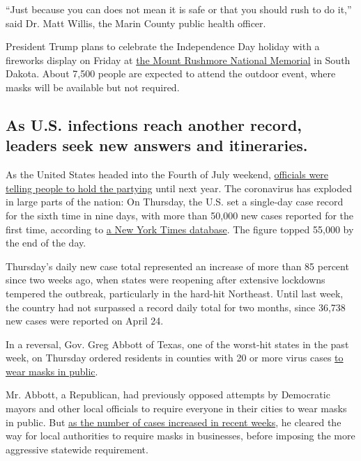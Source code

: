 ``Just because you can does not mean it is safe or that you should rush
to do it,'' said Dr. Matt Willis, the Marin County public health
officer.

President Trump plans to celebrate the Independence Day holiday with a
fireworks display on Friday at
\href{https://www.nytimes3xbfgragh.onion/2020/07/01/us/mount-rushmore.html}{the
Mount Rushmore National Memorial} in South Dakota. About 7,500 people
are expected to attend the outdoor event, where masks will be available
but not required.

\hypertarget{as-us-infections-reach-another-record-leaders-seek-new-answers-and-itineraries}{%
\subsection{As U.S. infections reach another record, leaders seek new
answers and
itineraries.}\label{as-us-infections-reach-another-record-leaders-seek-new-answers-and-itineraries}}

As the United States headed into the Fourth of July weekend,
\href{https://www.nytimes3xbfgragh.onion/2020/07/02/us/coronavirus-fourth-of-july.html}{officials
were telling people to hold the partying} until next year. The
coronavirus has exploded in large parts of the nation: On Thursday, the
U.S. set a single-day case record for the sixth time in nine days, with
more than 50,000 new cases reported for the first time, according to
\href{https://www.nytimes3xbfgragh.onion/interactive/2020/us/coronavirus-us-cases.html}{a
New York Times database}. The figure topped 55,000 by the end of the
day.

Thursday's daily new case total represented an increase of more than 85
percent since two weeks ago, when states were reopening after extensive
lockdowns tempered the outbreak, particularly in the hard-hit Northeast.
Until last week, the country had not surpassed a record daily total for
two months, since 36,738 new cases were reported on April 24.

In a reversal, Gov. Greg Abbott of Texas, one of the worst-hit states in
the past week, on Thursday ordered residents in counties with 20 or more
virus cases
\href{https://www.nytimes3xbfgragh.onion/2020/07/02/us/coronavirus-texas-masks.html}{to
wear masks in public}.

Mr. Abbott, a Republican, had previously opposed attempts by Democratic
mayors and other local officials to require everyone in their cities to
wear masks in public. But
\href{https://www.nytimes3xbfgragh.onion/interactive/2020/us/texas-coronavirus-cases.html}{as
the number of cases increased in recent weeks}, he cleared the way for
local authorities to require masks in businesses, before imposing the
more aggressive statewide requirement.


